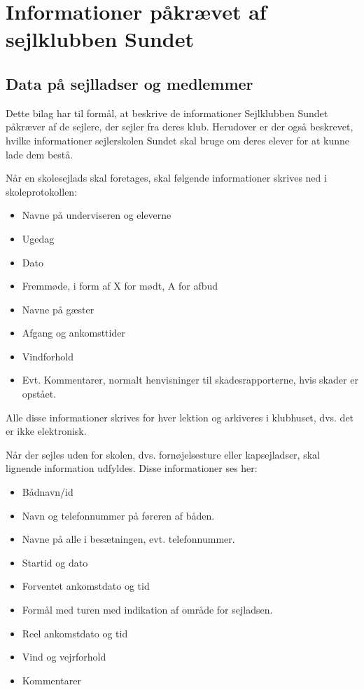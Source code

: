 \chapter{Informationer påkrævet af sejlklubben Sundet}\label{bilag:sundet}
\section{Data på sejlladser og medlemmer}

Dette bilag har til formål, at beskrive de informationer Sejlklubben Sundet påkræver af de sejlere, der sejler fra deres klub. 
Herudover er der også beskrevet, hvilke informationer sejlerskolen Sundet skal bruge om deres elever for at kunne lade dem bestå.

Når en skolesejlads skal foretages, skal følgende informationer skrives ned i skoleprotokollen:

\begin{itemize}
	\item Navne på underviseren og eleverne
	\item Ugedag
	\item Dato
	\item Fremmøde, i form af X for mødt, A for afbud
	\item Navne på gæster
	\item Afgang og ankomsttider
	\item Vindforhold
	\item Evt. Kommentarer, normalt henvisninger til skadesrapporterne, hvis skader er opstået.
\end{itemize}

Alle disse informationer skrives for hver lektion og arkiveres i klubhuset, dvs. det er ikke elektronisk.

Når der sejles uden for skolen, dvs. fornøjelsesture eller kapsejladser, skal lignende information udfyldes. 
Disse informationer ses her:

\begin{itemize}
	\item Bådnavn/id
	\item Navn og telefonnummer på føreren af båden.
	\item Navne på alle i besætningen, evt. telefonnummer.
	\item Startid og dato
	\item Forventet ankomstdato og tid
	\item Formål med turen med indikation af område for sejladsen.
	\item Reel ankomstdato og tid
	\item Vind og vejrforhold
	\item Kommentarer
\end{itemize}

